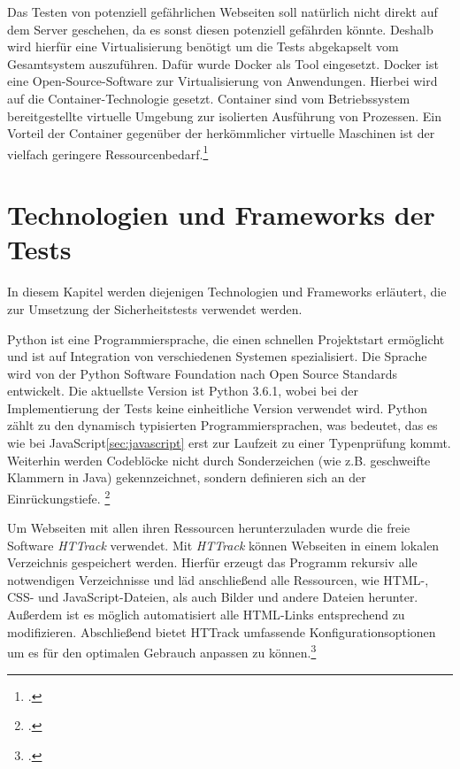 Das Testen von potenziell gefährlichen Webseiten soll natürlich nicht direkt auf dem Server geschehen, da es sonst diesen potenziell gefährden könnte. Deshalb wird hierfür eine Virtualisierung benötigt um die Tests abgekapselt vom Gesamtsystem auszuführen. Dafür wurde Docker als Tool eingesetzt. Docker ist eine Open-Source-Software zur Virtualisierung von Anwendungen. Hierbei wird auf die Container-Technologie gesetzt. Container sind vom Betriebssystem bereitgestellte virtuelle Umgebung zur isolierten Ausführung von Prozessen. Ein Vorteil der Container gegenüber der herkömmlicher virtuelle Maschinen ist der vielfach geringere Ressourcenbedarf.\footcite[Vgl.][]{docker}

\section{Technologien und Frameworks der Tests}

In diesem Kapitel werden diejenigen Technologien und Frameworks erläutert, die zur Umsetzung der Sicherheitstests verwendet werden.

Python ist eine Programmiersprache, die einen schnellen Projektstart ermöglicht und ist auf Integration von verschiedenen Systemen spezialisiert.
Die Sprache wird von der Python Software Foundation nach Open Source Standards entwickelt.
Die aktuellste Version ist Python 3.6.1, wobei bei der Implementierung der Tests keine einheitliche Version verwendet wird.
Python zählt zu den dynamisch typisierten Programmiersprachen, was bedeutet, das es wie bei JavaScript\ref{sec:javascript} erst zur Laufzeit zu einer Typenprüfung kommt.
Weiterhin werden Codeblöcke nicht durch Sonderzeichen (wie z.B. geschweifte Klammern in Java) gekennzeichnet, sondern definieren sich an der Einrückungstiefe.
\footcite{pythonHomepage}


Um Webseiten mit allen ihren Ressourcen herunterzuladen wurde die freie Software \textit{HTTrack} verwendet. Mit \textit{HTTrack} können Webseiten in einem lokalen Verzeichnis gespeichert werden. Hierfür erzeugt das Programm rekursiv alle notwendigen Verzeichnisse und läd anschließend alle Ressourcen, wie \ac{HTML}-, \ac{CSS}- und JavaScript-Dateien, als auch Bilder und andere Dateien herunter. Außerdem ist es möglich automatisiert alle \ac{HTML}-Links entsprechend zu modifizieren. Abschließend bietet HTTrack umfassende Konfigurationsoptionen um es für den optimalen Gebrauch anpassen zu können.\footcite[Vgl.][]{httrack}

